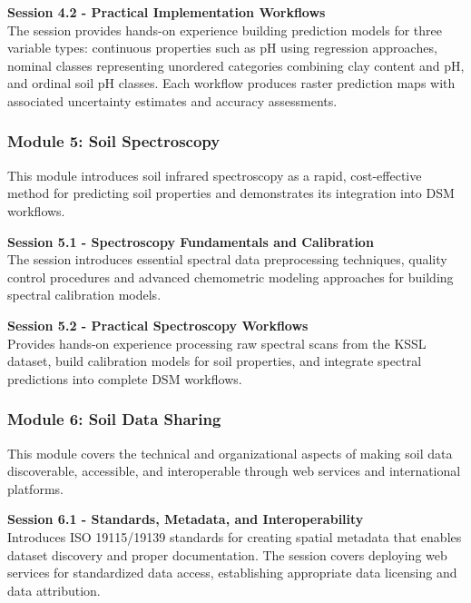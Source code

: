 \documentclass[
  10pt,
  b5paper,
  oneside]{book}
\begin{document}
\textbf{Session 4.2 - Practical Implementation Workflows}\\
The session provides hands-on experience building prediction models for three variable types: continuous properties such as pH using regression approaches, nominal classes representing unordered categories combining clay content and pH, and ordinal soil pH classes. Each workflow produces raster prediction maps with associated uncertainty estimates and accuracy assessments.

\subsubsection*{\texorpdfstring{\textbf{Module 5: Soil Spectroscopy}}{Module 5: Soil Spectroscopy}}\label{module-5-soil-spectroscopy}

This module introduces soil infrared spectroscopy as a rapid, cost-effective method for predicting soil properties and demonstrates its integration into DSM workflows.

\textbf{Session 5.1 - Spectroscopy Fundamentals and Calibration}\\
The session introduces essential spectral data preprocessing techniques, quality control procedures and advanced chemometric modeling approaches for building spectral calibration models.

\textbf{Session 5.2 - Practical Spectroscopy Workflows}\\
Provides hands-on experience processing raw spectral scans from the KSSL dataset, build calibration models for soil properties, and integrate spectral predictions into complete DSM workflows.

\subsubsection*{\texorpdfstring{\textbf{Module 6: Soil Data Sharing}}{Module 6: Soil Data Sharing}}\label{module-6-soil-data-sharing}

This module covers the technical and organizational aspects of making soil data discoverable, accessible, and interoperable through web services and international platforms.

\textbf{Session 6.1 - Standards, Metadata, and Interoperability}\\
Introduces ISO 19115/19139 standards for creating spatial metadata that enables dataset discovery and proper documentation. The session covers deploying web services for standardized data access, establishing appropriate data licensing and data attribution.
\end{document}
